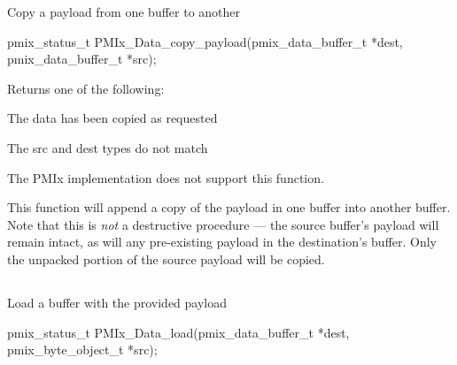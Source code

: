 Copy a payload from one buffer to another

\format

\cspecificstart
\begin{codepar}
pmix_status_t
PMIx_Data_copy_payload(pmix_data_buffer_t *dest,
                       pmix_data_buffer_t *src);
\end{codepar}
\cspecificend

\begin{arglist}
\end{arglist}

Returns one of the following:
\begin{constantdesc}
\item {} The data has been copied as requested
\item {} The src and dest  types do not match
\item {} The \ac{PMIx} implementation does not support this function.
\end{constantdesc}

\descr

This function will append a copy of the payload in one buffer into another buffer. Note that this is \textit{not} a destructive procedure --- the source buffer's payload will remain intact, as will any pre-existing payload in the destination's buffer. Only the unpacked portion of the source payload will be copied.


\subsection{}

\summary

Load a buffer with the provided payload

\format

\cspecificstart
\begin{codepar}
pmix_status_t
PMIx_Data_load(pmix_data_buffer_t *dest,
               pmix_byte_object_t *src);
\end{codepar}
\cspecificend

\begin{arglist}
\end{arglist}

